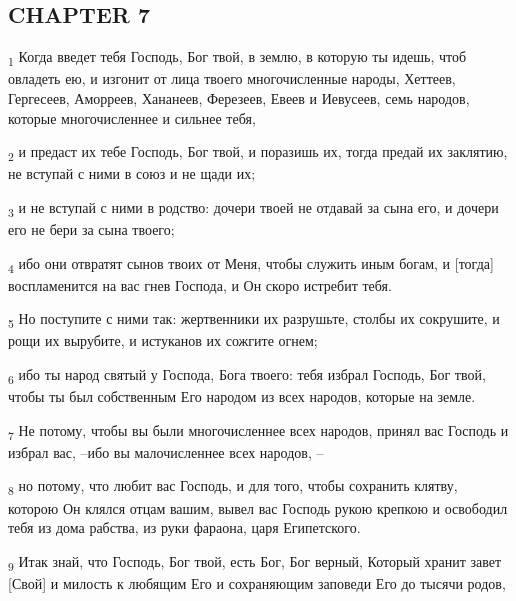 \subsection{CHAPTER 7}
\begin{tcolorbox}
\textsubscript{1} Когда введет тебя Господь, Бог твой, в землю, в которую ты идешь, чтоб овладеть ею, и изгонит от лица твоего многочисленные народы, Хеттеев, Гергесеев, Аморреев, Хананеев, Ферезеев, Евеев и Иевусеев, семь народов, которые многочисленнее и сильнее тебя,
\end{tcolorbox}
\begin{tcolorbox}
\textsubscript{2} и предаст их тебе Господь, Бог твой, и поразишь их, тогда предай их заклятию, не вступай с ними в союз и не щади их;
\end{tcolorbox}
\begin{tcolorbox}
\textsubscript{3} и не вступай с ними в родство: дочери твоей не отдавай за сына его, и дочери его не бери за сына твоего;
\end{tcolorbox}
\begin{tcolorbox}
\textsubscript{4} ибо они отвратят сынов твоих от Меня, чтобы служить иным богам, и [тогда] воспламенится на вас гнев Господа, и Он скоро истребит тебя.
\end{tcolorbox}
\begin{tcolorbox}
\textsubscript{5} Но поступите с ними так: жертвенники их разрушьте, столбы их сокрушите, и рощи их вырубите, и истуканов их сожгите огнем;
\end{tcolorbox}
\begin{tcolorbox}
\textsubscript{6} ибо ты народ святый у Господа, Бога твоего: тебя избрал Господь, Бог твой, чтобы ты был собственным Его народом из всех народов, которые на земле.
\end{tcolorbox}
\begin{tcolorbox}
\textsubscript{7} Не потому, чтобы вы были многочисленнее всех народов, принял вас Господь и избрал вас, --ибо вы малочисленнее всех народов, --
\end{tcolorbox}
\begin{tcolorbox}
\textsubscript{8} но потому, что любит вас Господь, и для того, чтобы сохранить клятву, которою Он клялся отцам вашим, вывел вас Господь рукою крепкою и освободил тебя из дома рабства, из руки фараона, царя Египетского.
\end{tcolorbox}
\begin{tcolorbox}
\textsubscript{9} Итак знай, что Господь, Бог твой, есть Бог, Бог верный, Который хранит завет [Свой] и милость к любящим Его и сохраняющим заповеди Его до тысячи родов,
\end{tcolorbox}
